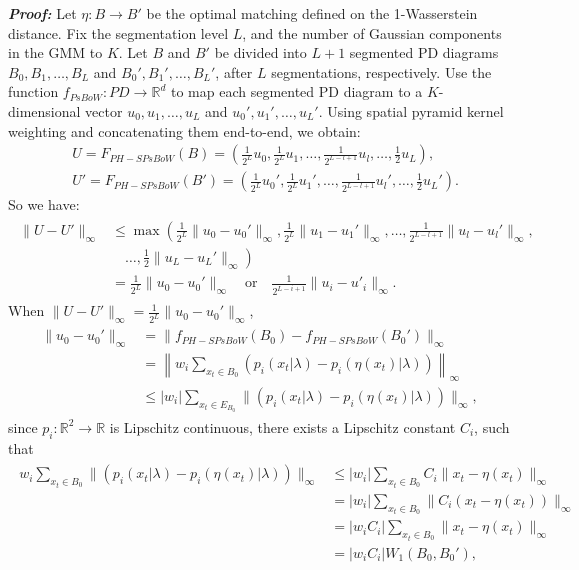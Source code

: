\documentclass[5GeSdc,ASOC,numref,printGA,printHL,CASflow,nocrossmark,longtitle,PROOF]{/usr/local/texlive/iTemplates/01-Templates/01-Els-Jnl/01-Standard_Templates/V1/ELS_MDL5-V1-6}
\begin{document}
\begin{articlestyle}
\textit{\textbf{Proof:}} Let $ \eta: B \rightarrow B' $ be the optimal matching defined on the 1-Wasserstein distance. Fix the segmentation level $ L $, and the number of Gaussian components in the GMM to $ K $. Let $ B $ and $ B' $ be divided into $ L+1 $ segmented PD diagrams $ B_0, B_1, \ldots, B_L $ and $ B_0', B_1', \ldots, B_L' $, after $ L $ segmentations, respectively. Use the function $ f_{PsBoW}: PD \rightarrow \mathbb{R}^d $ to map each segmented PD diagram to a $ K $-dimensional vector $ u_0, u_1, \ldots, u_L $ and $ u_0', u_1', \ldots, u_L' $. Using spatial pyramid kernel weighting and concatenating them end-to-end, we obtain:  
\begin{align*}  
&U = F_{PH-SPsBoW}(B) = \left( \frac{1}{2^L} u_0, \frac{1}{2^L} u_1, \ldots, \frac{1}{2^{L-l+1}} u_l,\ldots,\frac{1}{2} u_L \right),\\
&U' = F_{PH-SPsBoW}(B') = \left( \frac{1}{2^L} u_0', \frac{1}{2^L} u_1', \ldots, \frac{1}{2^{L-l+1}} u_l',\ldots,\frac{1}{2} u_L' \right).
\end{align*}  
So we have:  
\begin{align*}  
	\begin{aligned}  
		\| U - U' \|_\infty & \leq \max \left(   
		\frac{1}{2^L} \| u_0 - u_0' \|_\infty,   
		\frac{1}{2^L} \| u_1 - u_1' \|_\infty, \ldots,   
		\frac{1}{2^{L-l+1}} \| u_l - u_l' \|_\infty,\right.\\
		&\quad{}\left.\ldots,   
		\frac{1}{2} \| u_L - u_L' \|_\infty   
		\right) \\
		& = \frac{1}{2^L} \| u_0 - u_0' \|_\infty   
		\quad \text{or} \quad   
		\frac{1}{2^{L - i + 1}} \| u_i - u'_i \|_\infty.
	\end{aligned}  
\end{align*} 
When $ \| U - U' \|_\infty = \frac{1}{2^L} \| u_0 - u_0' \|_\infty $,  
\begin{align*}  
	\begin{aligned}  
		\| u_0 - u_0' \|_\infty & = \| f_{PH-SPsBoW}(B_0) - f_{PH-SPsBoW}(B_0') \|_\infty \\
		& = \left\| w_i\sum_{x_t \in B_0}  (p_i(x_t | \lambda) - p_i(\eta(x_t) | \lambda)) \right\|_\infty \\
		& \leq |w_i|\sum_{x_t \in E_{B_0}}  \| (p_i(x_t | \lambda) - p_i(\eta(x_t) | \lambda)) \|_\infty,
	\end{aligned}  
\end{align*} 
since $ p_i: \mathbb{R}^2 \rightarrow \mathbb{R} $ is Lipschitz continuous, there exists a Lipschitz constant $ C_i $, such that  
\begin{align*}  
	\begin{aligned}  
		w_i \sum_{x_t \in {B_0}} \| (p_i(x_t | \lambda) - p_i(\eta(x_t) | \lambda)) \|_\infty &\leq |w_i| \sum_{x_t \in {B_0}} C_i \| x_t - \eta(x_t) \|_\infty \\
		& = |w_i |\sum_{x_t \in {B_0}} \| C_i(x_t - \eta(x_t) )\|_\infty \\
		& = |w_i C_i |\sum_{x_t \in {B_0}} \| x_t - \eta(x_t) \|_\infty \\
		& = |w_i C_i |W_1(B_0,B_0'),
	\end{aligned}  
\end{align*} 



\end{articlestyle}
\end{document}
